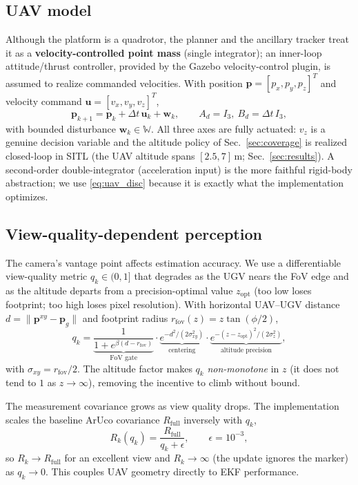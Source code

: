\documentclass[letterpaper, 10 pt, conference]{ieeeconf}  %
\begin{document}
\subsection{UAV model}
Although the platform is a quadrotor, the planner and the ancillary tracker treat
it as a \textbf{velocity-controlled point mass} (single integrator); an
inner-loop attitude/thrust controller, provided by the Gazebo velocity-control
plugin, is assumed to realize commanded velocities. With position
$\mathbf{p}=[p_x,p_y,p_z]^T$ and velocity command $\mathbf{u}=[v_x,v_y,v_z]^T$,
\begin{equation}
\mathbf{p}_{k+1} = \mathbf{p}_k + \Delta t\, \mathbf{u}_k + \mathbf{w}_k,
\qquad A_d=I_3,\ B_d=\Delta t\, I_3,
\label{eq:uav_disc}
\end{equation}
with bounded disturbance $\mathbf{w}_k\in\mathbb{W}$. All three axes are fully
actuated: $v_z$ is a genuine decision variable and the altitude policy of
Sec.~\ref{sec:coverage} is realized closed-loop in SITL (the UAV altitude spans
$[2.5,7]$\,m; Sec.~\ref{sec:results}). A
second-order double-integrator (acceleration input) is the more faithful
rigid-body abstraction; we use \eqref{eq:uav_disc} because it is exactly what the
implementation optimizes.

\subsection{View-quality-dependent perception}
The camera's vantage point affects estimation accuracy. We use a differentiable
view-quality metric $q_k\in(0,1]$ that degrades as the UGV nears the FoV edge and
as the altitude departs from a precision-optimal value $z_{\mathrm{opt}}$ (too low
loses footprint; too high loses pixel resolution). With horizontal UAV--UGV
distance $d=\lVert\mathbf{p}^{xy}-\mathbf{p}_g\rVert$ and footprint radius
$r_{\mathrm{fov}}(z)=z\tan(\phi/2)$,
\begin{equation}
q_k =
\underbrace{\frac{1}{1+e^{\beta(d-r_{\mathrm{fov}})}}}_{\text{FoV gate}}\!\cdot\!
\underbrace{e^{-d^2/(2\sigma_{xy}^2)}}_{\text{centering}}\!\cdot\!
\underbrace{e^{-(z-z_{\mathrm{opt}})^2/(2\sigma_z^2)}}_{\text{altitude precision}},
\label{eq:q}
\end{equation}
with $\sigma_{xy}=r_{\mathrm{fov}}/2$. The altitude factor makes $q_k$
\emph{non-monotone} in $z$ (it does not tend to $1$ as $z\to\infty$), removing the
incentive to climb without bound.

The measurement covariance grows as view quality drops. The implementation scales
the baseline ArUco covariance $R_{\mathrm{full}}$ inversely with $q_k$,
\begin{equation}
R_k(q_k) = \frac{R_{\mathrm{full}}}{q_k + \epsilon},
\qquad \epsilon=10^{-3},
\label{eq:Rk}
\end{equation}
so $R_k\to R_{\mathrm{full}}$ for an excellent view and $R_k\to\infty$ (the
update ignores the marker) as $q_k\to0$. This couples UAV geometry directly to
EKF performance.
\end{document}
